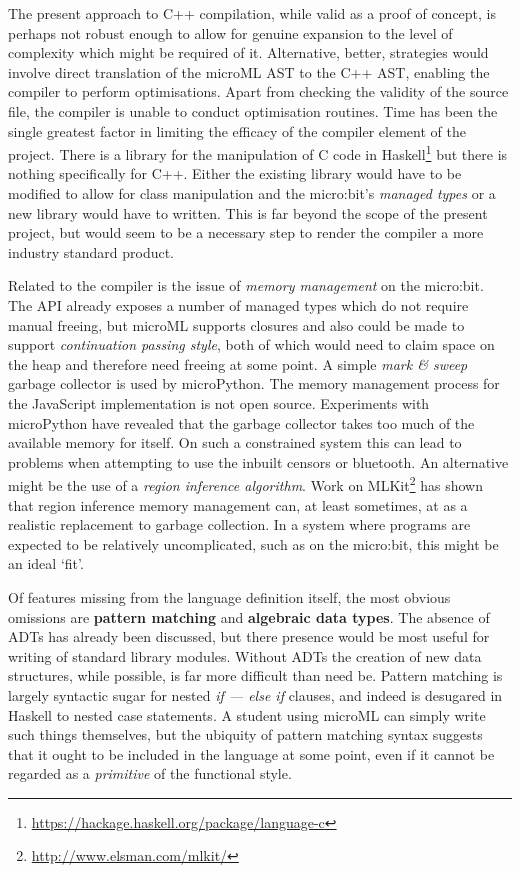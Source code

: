 \documentclass[12pt, a4paper]{report}
\begin{document}
The present approach to C++ compilation, while valid as a proof of concept, is perhaps not robust
enough to allow for genuine expansion to the level of complexity which might be required of it.
Alternative, better, strategies would involve direct translation of the microML AST to the C++ AST,
enabling the compiler to perform optimisations. Apart from checking the validity of the source file,
the compiler is unable to conduct optimisation routines. Time has been the single greatest factor in
limiting the efficacy of the compiler element of the project. There is a library for the manipulation
of C code in Haskell\footnote{\url{https://hackage.haskell.org/package/language-c}} but there is
nothing specifically for C++. Either the existing library would have  to be modified to allow for
class manipulation and the micro:bit's \textit{managed types} or a new library would have to
written. This is far beyond the scope of the present project, but would seem to be a necessary step
to render the compiler a more industry standard product.

Related to the compiler is the issue of \textit{memory management} on the micro:bit. The API already
exposes a number of managed types which do not require manual freeing, but microML supports closures
and also could be made to support \textit{continuation passing style}, both of which would need to
claim space on the heap and therefore need freeing at some point. A simple \textit{mark \& sweep}
garbage collector is used by microPython. The memory management process for the JavaScript
implementation is not open source. Experiments with microPython have revealed that the garbage
collector takes too much of the available memory for itself. On such a constrained system this can
lead to problems when attempting to use the inbuilt censors or bluetooth. An alternative might be
the use of a \textit{region inference algorithm}\cite{Tofte:2004:RRM:993034.993040}. Work on
MLKit\footnote{\url{http://www.elsman.com/mlkit/}} has shown that region inference memory management
can, at least sometimes, at as a realistic replacement to garbage collection. In a system where
programs are expected to be relatively uncomplicated, such as on the micro:bit, this might be an
ideal `fit'.

Of features missing from the language definition itself, the most obvious omissions are
\textbf{pattern matching} and \textbf{algebraic data types}. The absence of ADTs has already been
discussed, but there presence would be most useful for writing of standard library modules. Without
ADTs the creation of new data structures, while possible, is far more difficult than need be.
Pattern matching is largely syntactic sugar for nested \textit{if --- else if} clauses, and indeed
is desugared in Haskell to nested case statements. A student using microML can simply write such
things themselves, but the ubiquity of pattern matching syntax suggests that it ought to be included
in the language at some point, even if it cannot be regarded as a \textit{primitive} of the
functional style. 
\end{document}
